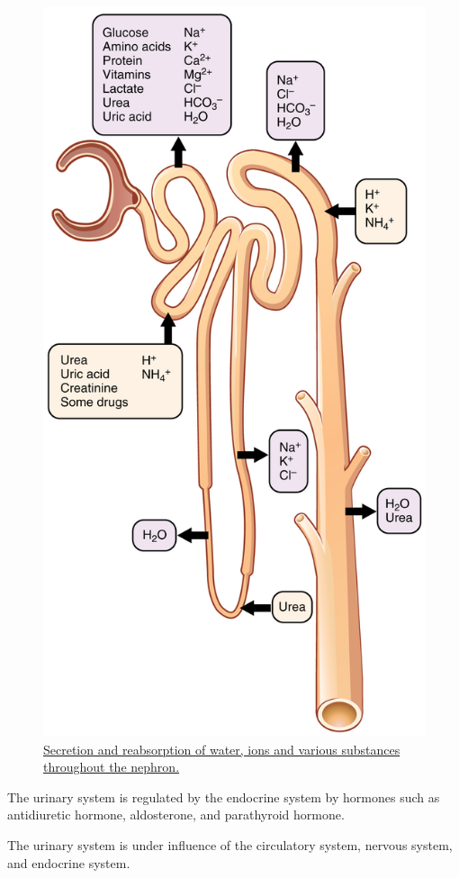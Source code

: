 \begin{figure}

{\centering \includegraphics[width=0.7\linewidth]{./figures/excretory/2618_Nephron_Secretion_Reabsorption} 

}

\caption{\href{https://upload.wikimedia.org/wikipedia/commons/2/26/2618_Nephron_Secretion_Reabsorption.jpg}{Secretion and reabsorption of water, ions and various substances throughout the nephron.}}\label{fig:secretionreabsorption}
\end{figure}

The urinary system is regulated by the endocrine system by hormones such as antidiuretic hormone, aldosterone, and parathyroid hormone.

The urinary system is under influence of the circulatory system, nervous system, and endocrine system.

